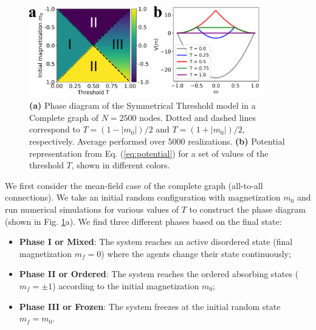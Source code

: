 \begin{figure}
	\centering \captionsetup{font=sf}
	\includegraphics[width=0.9\textwidth]{Figs/Aging_STM/FIG1.pdf}
	\caption[Phases of the Symmetrical Threshold model]{\textbf{(a)} Phase diagram of the Symmetrical Threshold model in a Complete graph of $N = 2500$ nodes. Dotted and dashed lines correspond to $T = (1-|m_0|)/2$ and $T = (1+|m_0|)/2$, respectively. Average performed over 5000 realizations. \textbf{(b)} Potential representation from Eq. (\ref{eq:potential}) for a set of values of the threshold $T$, shown in different colors.}
	\label{COM_LAT_PD}
\end{figure}

We first consider the mean-field case of the complete graph (all-to-all connections). We take an initial random configuration with magnetization $m_0$ and run numerical simulations for various values of $T$ to construct the phase diagram (shown in Fig. \ref{COM_LAT_PD}a). We find three different phases based on the final state:
\pagebreak
\begin{itemize}
	\item \textbf{Phase I or Mixed}: The system reaches an active disordered state (final magnetization $m_f = 0$) where the agents change their state continuously;
	\item \textbf{Phase II or Ordered}: The system reaches the ordered absorbing states ($m_f = \pm 1$) according to the initial magnetization $m_0$;
	\item \textbf{Phase III or Frozen}: The system freezes at the initial random state $m_f = m_0$.
\end{itemize}

